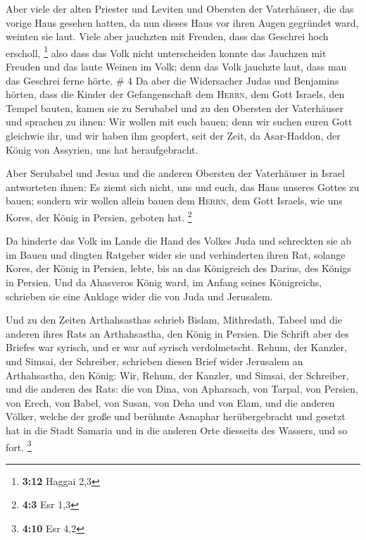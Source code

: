  Aber viele der alten Priester und Leviten und Obersten
der Vaterhäuser, die das vorige Haus gesehen hatten, da nun dieses Haus
vor ihren Augen gegründet ward, weinten sie laut. Viele aber jauchzten
mit Freuden, dass das Geschrei hoch erscholl, \footnote{\textbf{3:12}
  Haggai 2,3}  also dass das Volk nicht unterscheiden
konnte das Jauchzen mit Freuden und das laute Weinen im Volk; denn das
Volk jauchzte laut, dass man das Geschrei ferne hörte. \# 4
 Da aber die Widersacher Judas und Benjamins hörten, dass
die Kinder der Gefangenschaft dem \textsc{Herrn}, dem Gott Israels, den
Tempel bauten,  kamen sie zu Serubabel und zu den Obersten
der Vaterhäuser und sprachen zu ihnen: Wir wollen mit euch bauen; denn
wir suchen euren Gott gleichwie ihr, und wir haben ihm geopfert, seit
der Zeit, da Asar-Haddon, der König von Assyrien, uns hat
heraufgebracht.

 Aber Serubabel und Jesua und die anderen Obersten der
Vaterhäuser in Israel antworteten ihnen: Es ziemt sich nicht, uns und
euch, das Haus unseres Gottes zu bauen; sondern wir wollen allein bauen
dem \textsc{Herrn}, dem Gott Israels, wie uns Kores, der König in
Persien, geboten hat. \footnote{\textbf{4:3} Esr 1,3}

 Da hinderte das Volk im Lande die Hand des Volkes Juda
und schreckten sie ab im Bauen  und dingten Ratgeber wider
sie und verhinderten ihren Rat, solange Kores, der König in Persien,
lebte, bis an das Königreich des Darius, des Königs in Persien.
 Und da Ahasveros König ward, im Anfang seines
Königreichs, schrieben sie eine Anklage wider die von Juda und
Jerusalem.

 Und zu den Zeiten Arthahsasthas schrieb Bislam,
Mithredath, Tabeel und die anderen ihres Rats an Arthahsastha, den König
in Persien. Die Schrift aber des Briefes war syrisch, und er war auf
syrisch verdolmetscht.  Rehum, der Kanzler, und Simsai,
der Schreiber, schrieben diesen Brief wider Jerusalem an Arthahsastha,
den König:  Wir, Rehum, der Kanzler, und Simsai, der
Schreiber, und die anderen des Rats: die von Dina, von Apharsach, von
Tarpal, von Persien, von Erech, von Babel, von Susan, von Deha und von
Elam,  und die anderen Völker, welche der große und
berühmte Asnaphar herübergebracht und gesetzt hat in die Stadt Samaria
und in die anderen Orte diesseits des Wassers, und so fort. \footnote{\textbf{4:10}
  Esr 4,2}

